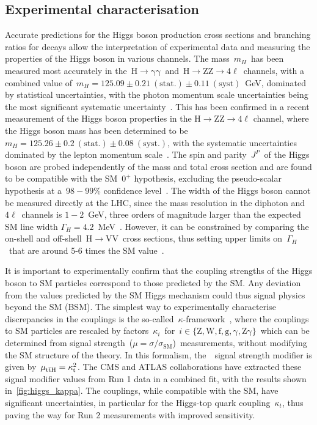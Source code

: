 \subsection{Experimental characterisation}
Accurate predictions for the Higgs boson production cross sections and branching ratios for decays allow the interpretation of experimental data and measuring the properties of the Higgs boson in various channels. The mass~$m_H$~has been measured most accurately in the~$\mathrm{H}\rightarrow\mathrm{\gamma}\mathrm{\gamma}$~and~$\mathrm{H} \rightarrow \mathrm{Z}\mathrm{Z} \rightarrow 4\ell$~channels, with a combined value of~$m_H = 125.09 \pm 0.21~(\mathrm{stat}.) \pm 0.11~(\mathrm{syst})$~GeV, dominated by statistical uncertainties, with the photon momentum scale uncertainties being the most significant systematic uncertainty~\cite{Aad:2015zhl}. This has been confirmed in a recent measurement of the Higgs boson properties in the $\mathrm{H} \rightarrow \mathrm{Z}\mathrm{Z} \rightarrow 4\mathrm{\ell}$ channel, where the Higgs boson mass has been determined to be $m_H = 125.26 \pm 0.2~\mathrm{(stat.)} \pm 0.08~\mathrm{(syst.)}$, with the systematic uncertainties dominated by the lepton momentum scale~\cite{Sirunyan:2017exp}. The spin and parity~$J^P$~of the Higgs boson are probed independently of the mass and total cross section and are found to be compatible with the SM~$0^+$ hypothesis, excluding the pseudo-scalar hypothesis at a~$98-99\%$ confidence level~\cite{Khachatryan:2014kca,Aad:2013xqa}. The width of the Higgs boson cannot be measured directly at the LHC, since the mass resolution in the diphoton and~$4\ell$~channels is $1-2$~GeV, three orders of magnitude larger than the expected SM line width $\Gamma_H = 4.2$~MeV~\cite{Patrignani:2016xqp}. However, it can be constrained by comparing the on-shell and off-shell~$\mathrm{H} \rightarrow \mathrm{VV}$~cross sections, thus setting upper limits on~$\Gamma_H$~that are around 5-6 times the SM value~\cite{Khachatryan:2014iha}.

It is important to experimentally confirm that the coupling strengths of the Higgs boson to SM particles correspond to those predicted by the SM. Any deviation from the values predicted by the SM Higgs mechanism could thus signal physics beyond the SM (BSM). The simplest way to experimentally characterise discrepancies in the couplings is the so-called~$\kappa$-framework~\cite{Heinemeyer:2013tqa}, where the couplings to SM particles are rescaled by factors~$\kappa_i$~for~$i \in \{\mathrm{Z}, \mathrm{W}, \mathrm{f}, \mathrm{g}, \mathrm{\gamma}, \mathrm{Z\gamma}\}$~which can be determined from signal strength~($\mu = \sigma / \sigma_{\mathrm{SM}}$)~measurements, without modifying the SM structure of the theory. In this formalism, the~\ttH~signal strength modifier is given by~$\mu_{\mathrm{t} \bar{\mathrm{t}} \mathrm{H}} = \kappa_{\mathrm{t}}^2$. The CMS and ATLAS collaborations have extracted these signal modifier values from Run 1 data in a combined fit, with the results shown in~\cref{fig:higgs_kappa}. The couplings, while compatible with the SM, have significant uncertainties, in particular for the Higgs-top quark coupling~$\kappa_t$, thus paving the way for Run 2 measurements with improved sensitivity.

